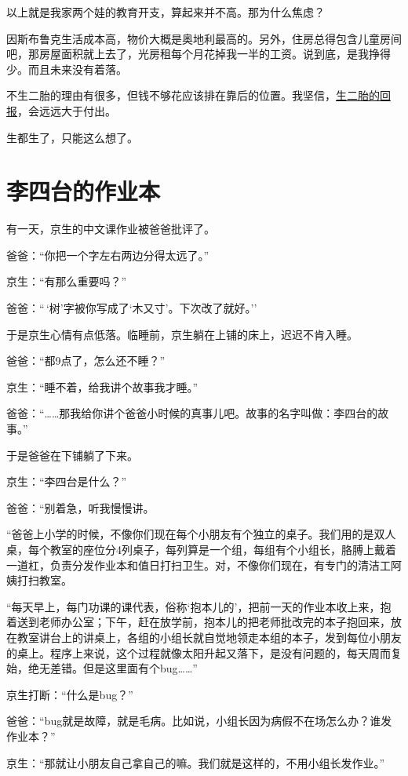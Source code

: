 \documentclass[twoside,openright,headings=optiontohead]{ctexbook} %
\begin{document}
{以上就是我家两个娃的教育开支，算起来并不高。那为什么焦虑？

因斯布鲁克生活成本高，物价大概是奥地利最高的。另外，住房总得包含儿童房间吧，那房屋面积就上去了，光房租每个月花掉我一半的工资。说到底，是我挣得少。而且未来没有着落。

不生二胎的理由有很多，但钱不够花应该排在靠后的位置。我坚信，\href{http://dapengde.com/archives/17477}{生二胎的回报}，会远远大于付出。

生都生了，只能这么想了。

\chapter*{李四台的作业本}\label{sitai}

有一天，京生的中文课作业被爸爸批评了。

爸爸：``你把一个字左右两边分得太远了。''

京生：``有那么重要吗？''

爸爸：``\,`树'字被你写成了`木又寸'。下次改了就好。''

于是京生心情有点低落。临睡前，京生躺在上铺的床上，迟迟不肯入睡。

爸爸：``都9点了，怎么还不睡？''

京生：``睡不着，给我讲个故事我才睡。''

爸爸：``\ldots{}\ldots{}那我给你讲个爸爸小时候的真事儿吧。故事的名字叫做：李四台的故事。''

于是爸爸在下铺躺了下来。

京生：``李四台是什么？''

爸爸：``别着急，听我慢慢讲。

``爸爸上小学的时候，不像你们现在每个小朋友有个独立的桌子。我们用的是双人桌，每个教室的座位分4列桌子，每列算是一个组，每组有个小组长，胳膊上戴着一道杠，负责分发作业本和值日打扫卫生。对，不像你们现在，有专门的清洁工阿姨打扫教室。

``每天早上，每门功课的课代表，俗称`抱本儿的'，把前一天的作业本收上来，抱着送到老师办公室；下午，赶在放学前，抱本儿的把老师批改完的本子抱回来，放在教室讲台上的讲桌上，各组的小组长就自觉地领走本组的本子，发到每位小朋友的桌上。程序上来说，这个过程就像太阳升起又落下，是没有问题的，每天周而复始，绝无差错。但是这里面有个bug\ldots{}\ldots{}''

京生打断：``什么是bug？''

爸爸：``bug就是故障，就是毛病。比如说，小组长因为病假不在场怎么办？谁发作业本？''

京生：``那就让小朋友自己拿自己的嘛。我们就是这样的，不用小组长发作业。''

}
\end{document}
